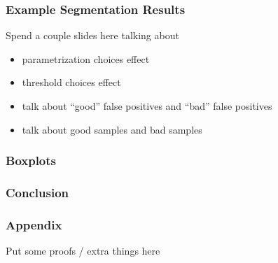 \documentclass[9pt,notes]{beamer}
\begin{document}
\begin{frame}
\frametitle{Example Segmentation Results}
Spend a couple slides here talking about
\begin{itemize}
  \item parametrization choices effect
  \item threshold choices effect
  \item talk about ``good'' false positives and  ``bad'' false positives
  \item talk about good samples and bad samples
\end{itemize}
\end{frame}

\begin{frame}
\frametitle{Boxplots}
\end{frame}

\begin{frame}
\frametitle{Conclusion}
\end{frame}

\begin{frame}
\frametitle{Appendix}
Put some proofs / extra things here
\end{frame}
\end{document}
